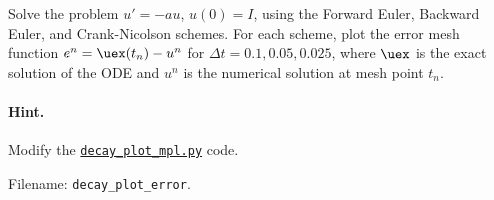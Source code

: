 \documentclass[graybox,sectrefs,envcountresetchap,open=right,final]{svmonodo}
\makeatletter
\newenvironment{doconceexercise}{}{}
\newcounter{doconceexercisecounter}%
\newcommand\listofexercises{
\chapter*{List of Exercises, Problems, and Projects
          \@mkboth{List of Exercises, Problems, and Projects}{List of Exercises, Problems, and Projects}}
\markboth{List of Exercises, Problems, and Projects}{List of Exercises, Problems, and Projects}
\@starttoc{loe}
}
\makeatother
\begin{document}
\begin{doconceexercise}

                
\label{decay:exer:plot:error}

Solve the problem $u'=-au$, $u(0)=I$, using the Forward Euler, Backward
Euler, and Crank-Nicolson schemes. For each scheme, plot the error mesh
function $e^n = \uex(t_n)-u^n$ for $\Delta t=0.1, 0.05, 0.025$,
where $\uex$ is the exact solution of the ODE and
$u^n$ is the numerical solution at mesh point $t_n$.


\paragraph{Hint.}
Modify the \href{{http://tinyurl.com/ofkw6kc/alg/decay_plot_mpl.py}}{\nolinkurl{decay_plot_mpl.py}} code.


\noindent Filename: \Verb!decay_plot_error!.

\end{doconceexercise}
\end{document}

